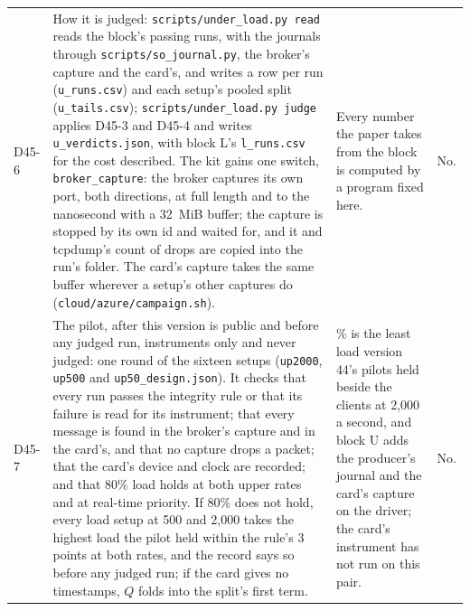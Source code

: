 \documentclass[11pt]{article}
\begin{document}
{\begin{longtable}{@{}p{1.1cm} >{\raggedright\arraybackslash}p{6.1cm} >{\raggedright\arraybackslash}p{6.0cm} >{\raggedright\arraybackslash}p{2.2cm}@{}}
D45-6 & How it is judged: \texttt{scripts/under\_load.py read} reads the block's passing runs, with the journals through \texttt{scripts/so\_journal.py}, the broker's capture and the card's, and writes a row per run (\texttt{u\_runs.csv}) and each setup's pooled split (\texttt{u\_tails.csv}); \texttt{scripts/under\_load.py judge} applies D45-3 and D45-4 and writes \texttt{u\_verdicts.json}, with block L's \texttt{l\_runs.csv} for the cost described. The kit gains one switch, \texttt{broker\_capture}: the broker captures its own port, both directions, at full length and to the nanosecond with a 32~MiB buffer; the capture is stopped by its own id and waited for, and it and tcpdump's count of drops are copied into the run's folder. The card's capture takes the same buffer wherever a setup's other captures do (\texttt{cloud/azure/campaign.sh}). & Every number the paper takes from the block is computed by a program fixed here. & No. \\
D45-7 & The pilot, after this version is public and before any judged run, instruments only and never judged: one round of the sixteen setups (\texttt{up2000}, \texttt{up500} and \texttt{up50\_design.json}). It checks that every run passes the integrity rule or that its failure is read for its instrument; that every message is found in the broker's capture and in the card's, and that no capture drops a packet; that the card's device and clock are recorded; and that 80\% load holds at both upper rates and at real-time priority. If 80\% does not hold, every load setup at 500 and 2,000 takes the highest load the pilot held within the rule's 3 points at both rates, and the record says so before any judged run; if the card gives no timestamps, $Q$ folds into the split's first term. & 80\% is the least load version 44's pilots held beside the clients at 2,000 a second, and block U adds the producer's journal and the card's capture on the driver; the card's instrument has not run on this pair. & No. \\

\end{longtable}}
\end{document}
